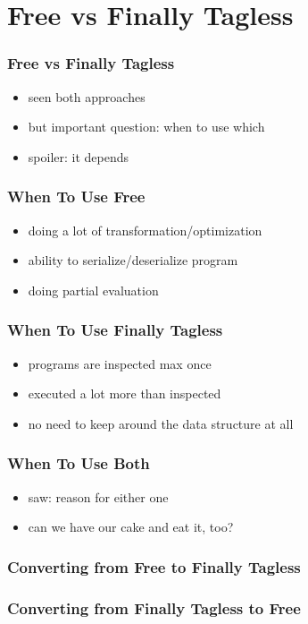 \documentclass[aspectratio=169]{beamer}
\begin{document}
\section{Free vs Finally Tagless}\label{sec:free-vs-tagless}

\begin{frame}
  \frametitle{Free vs Finally Tagless}
  \begin{itemize}
  \item seen both approaches
  \item but important question: when to use which
  \item spoiler: it depends
  \end{itemize}
\end{frame}

\begin{frame}
  \frametitle{When To Use Free}
  \begin{itemize}
  \item doing a lot of transformation/optimization
  \item ability to serialize/deserialize program
  \item doing partial evaluation
  \end{itemize}
\end{frame}

\begin{frame}
  \frametitle{When To Use Finally Tagless}
  \begin{itemize}
  \item programs are inspected max once
  \item executed a lot more than inspected
  \item no need to keep around the data structure at all
  \end{itemize}
\end{frame}

\begin{frame}
  \frametitle{When To Use Both}
  \begin{itemize}
  \item saw: reason for either one
  \item can we have our cake and eat it, too?
  \end{itemize}
\end{frame}

\begin{frame}
  \frametitle{Converting from Free to Finally Tagless}
\end{frame}

\begin{frame}
  \frametitle{Converting from Finally Tagless to Free}
\end{frame}
\end{document}
